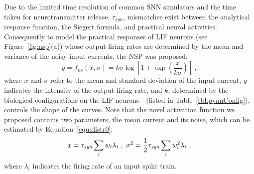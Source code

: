 %	
	Due to the limited time resolution of common SNN simulators and the time taken for neurotransmitter release, $\tau_{syn}$, mismatches exist between the analytical response function, the Siegert formula, and practical neural activities.
	Consequently to model the practical responses of LIF neurons (see Figure~\ref{fig:nsp}(a)) whose output firing rates are determined by the mean and variance of the noisy input currents, the NSP was proposed:
	\begin{equation}
	y = f_{ns}(x, \sigma) = k \sigma \log [1 + \exp(\frac{x}{k \sigma})]~,
	\label{equ:nsp}
	\end{equation}
	where $x$ and $\sigma$ refer to the mean and standard deviation of the input current, $y$ indicates the intensity of the output firing rate, and $k$, determined by the biological configurations on the LIF neurons~\citep{liu2016noisy}~(listed in Table~\ref{tbl:pynnConfig}), controls the shape of the curves.
	Note that the novel activation function we proposed contains two parameters, the mean current and its noise, which can be estimated by Equation~\ref{equ:distr0}:
	\begin{equation}
	x = \tau_{\textit{\textrm{syn}}}\sum_i w_i\lambda_{i}~, ~\sigma^2=\frac{1}{2}\tau_{\textit{\textrm{syn}}}\sum_i w_i^2\lambda_{i}~,
	\label{equ:distr}
	\end{equation}
	where $\lambda_i$ indicates the firing rate of an input spike train.
